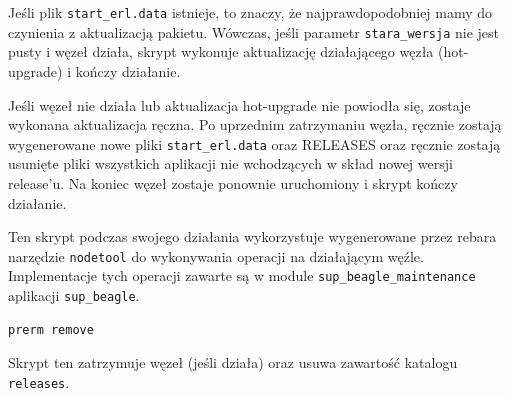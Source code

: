 \documentclass[polish,12pt]{aghthesis}
\begin{document}
Jeśli plik \texttt{start\_erl.data} istnieje, to znaczy, że najprawdopodobniej mamy do czynienia z aktualizacją pakietu. Wówczas, jeśli parametr \texttt{stara\_wersja} nie jest pusty i węzeł działa, skrypt wykonuje aktualizację działającego węzła (hot-upgrade) i kończy działanie.

Jeśli węzeł nie działa lub aktualizacja hot-upgrade nie powiodła się, zostaje wykonana aktualizacja ręczna. Po uprzednim zatrzymaniu węzła, ręcznie zostają wygenerowane nowe pliki \texttt{start\_erl.data} oraz RELEASES oraz ręcznie zostają usunięte pliki wszystkich aplikacji nie wchodzących w skład nowej wersji release'u. Na koniec węzeł zostaje ponownie uruchomiony i skrypt kończy działanie.

Ten skrypt podczas swojego działania wykorzystuje wygenerowane przez rebara narzędzie \texttt{nodetool} do wykonywania operacji na działającym węźle. Implementacje tych operacji zawarte są w module \texttt{sup\_beagle\_maintenance} aplikacji \texttt{sup\_beagle}.

\begin{verbatim}
prerm remove
\end{verbatim}

Skrypt ten zatrzymuje węzeł (jeśli działa) oraz usuwa zawartość katalogu \texttt{releases}.
\clearpage
\listoffigures
\end{document}
